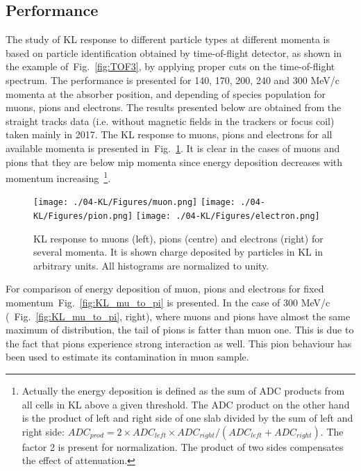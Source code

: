 \subsection{Performance}
\label{SubSect:KL_Performance}

The study of KL response to different particle types at different momenta is based on particle identification obtained by time-of-flight detector, as shown in the example of~Fig.~\ref{fig:TOF3}, by applying proper cuts on the time-of-flight spectrum. The performance is presented for 140, 170, 200, 240 and 300 MeV/c momenta at the absorber position, and depending of species population for muons, pions and electrons. The results presented below are obtained from the straight tracks data (i.e. without magnetic fields in the trackers or focus coil) taken mainly in 2017. The KL response to muons, pions and electrons for all available momenta is presented in~Fig.~\ref{fig:KL_to_mu_pi_e}. It is clear in the cases of muons and pions that they are below mip momenta since energy deposition decreases with momentum increasing~\footnote{Actually the energy deposition is defined as the sum of ADC products from all cells in KL above a given threshold. The ADC product on the other hand is the product of left and right side of one slab divided by the sum of left and right side: $ADC_{prod} = 2 \times ADC_{left}  \times ADC_{right} / (ADC_{left} + ADC_{right})$. The factor 2 is present for normalization. The product of two sides compensates the effect of attenuation.}.
  \begin{figure}
	\begin{center}
  		\texttt{[image: ./04-KL/Figures/muon.png]}
  		\texttt{[image: ./04-KL/Figures/pion.png]}
  		\texttt{[image: ./04-KL/Figures/electron.png]}
  		\caption{KL response to muons (left), pions (centre) and electrons (right) for several momenta. It is shown charge deposited by particles in KL in arbitrary units. All histograms are normalized to unity.}
  		\label{fig:KL_to_mu_pi_e}
  	\end{center}
  \end{figure}

For comparison of energy deposition of muon, pions and electrons for fixed momentum~Fig.~\ref{fig:KL_mu_to_pi} is presented. In the case of 300 MeV/c (~Fig.~\ref{fig:KL_mu_to_pi}, right), where muons and pions have almost the same maximum of distribution, the tail of pions is fatter than muon one. This is due to the fact that pions experience strong interaction as well. This pion behaviour has been used to estimate its contamination in muon sample. 

